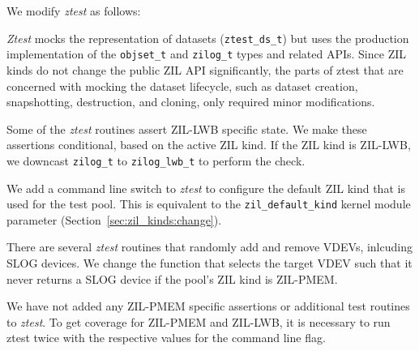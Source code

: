 \documentclass[12pt,a4paper,twoside]{book}
\begin{document}
We modify \textit{ztest} as follows:
\begin{description}[noitemsep]
    \item[Mocking]  \textit{Ztest} mocks the representation of datasets (\lstinline{ztest_ds_t}) but uses the production implementation of the \lstinline{objset_t} and \lstinline{zilog_t} types and related APIs.
        Since ZIL kinds do not change the public ZIL API significantly, the parts of ztest that are concerned with mocking the dataset lifecycle, such as dataset creation, snapshotting, destruction, and cloning, only required minor modifications.
    \item[ZIL-LWB Specific Assertions] Some of the \textit{ztest} routines assert ZIL-LWB specific state.
        We make these assertions conditional, based on the active ZIL kind.
        If the ZIL kind is ZIL-LWB, we downcast \lstinline{zilog_t} to \lstinline{zilog_lwb_t} to perform the check.
    \item[Configurable ZIL Kinds] We add a command line switch to \textit{ztest} to configure the default ZIL kind that is used for the test pool.
        This is equivalent to the \lstinline{zil_default_kind} kernel module parameter (Section~\ref{sec:zil_kinds:change}).
    \item[VDEV Management] There are several \textit{ztest} routines that randomly add and remove VDEVs, inlcuding SLOG devices.
        We change the function that selects the target VDEV such that it never returns a SLOG device if the pool's ZIL kind is ZIL-PMEM.
\end{description}
We have not added any ZIL-PMEM specific assertions or additional test routines to \textit{ztest}.
To get coverage for ZIL-PMEM and ZIL-LWB, it is necessary to run ztest twice with the respective values for the command line flag.
\end{document}
